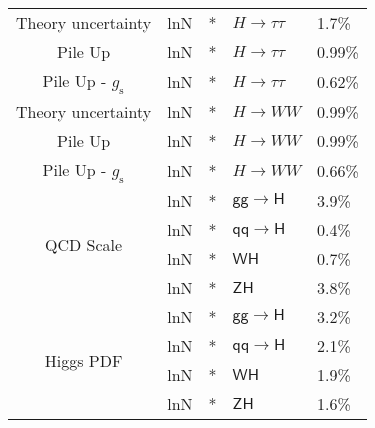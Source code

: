 \begin{table}[!]
\begin{tabular}{cllll}
        Theory uncertainty                      & lnN                   & *                             & $H\rightarrow\tau\tau$    & 1.7\%           \\ 
        Pile Up                                 & lnN                   & *                             & $H\rightarrow\tau\tau$    & 0.99\%           \\ 
        Pile Up - $g_\text{s}$                  & lnN                   & *                             & $H\rightarrow\tau\tau$    & 0.62\%           \\ 
        Theory uncertainty                      & lnN                   & *                             & $H\rightarrow WW$    & 0.99\%           \\ 
        Pile Up                                 & lnN                   & *                             & $H\rightarrow WW$    & 0.99\%           \\ 
        Pile Up - $g_\text{s}$                  & lnN                   & *                             & $H\rightarrow WW$    & 0.66\%           \\ 
        \multirow{4}{*}{QCD Scale}              & lnN                   & *                             & $\mathsf{gg\rightarrow H}$    & 3.9\% \\
                                                & lnN                   & *                             & $\mathsf{qq\rightarrow H}$    & 0.4\% \\
                                                & lnN                   & *                             & $\mathsf{WH}$    & 0.7\% \\
                                                & lnN                   & *                             & $\mathsf{ZH}$    & 3.8\% \\
        \multirow{4}{*}{Higgs PDF}              & lnN                   & *                             & $\mathsf{gg\rightarrow H}$    & 3.2\% \\
                                                & lnN                   & *                             & $\mathsf{qq\rightarrow H}$    & 2.1\% \\
                                                & lnN                   & *                             & $\mathsf{WH}$    & 1.9\% \\
                                                & lnN                   & *                             & $\mathsf{ZH}$    & 1.6\% \\ \bottomrule
    \end{tabular}
\end{table}
\clearpage
